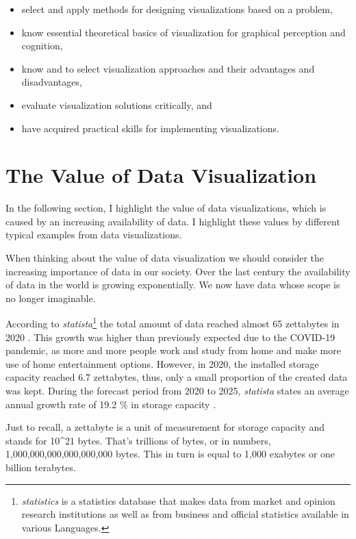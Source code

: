 \documentclass[
]{book}
\providecommand{\tightlist}{%
  \setlength{\itemsep}{0pt}\setlength{\parskip}{0pt}}
\begin{document}
\begin{itemize}
\tightlist
\item
  select and apply methods for designing visualizations based on a problem,
\item
  know essential theoretical basics of visualization for graphical perception and cognition,
\item
  know and to select visualization approaches and their advantages and disadvantages,
\item
  evaluate visualization solutions critically, and
\item
  have acquired practical skills for implementing visualizations.
\end{itemize}

\hypertarget{the-value-of-data-visualization}{%
\chapter{The Value of Data Visualization}\label{the-value-of-data-visualization}}

In the following section, I highlight the value of data visualizations, which is caused by an increasing availability of data. I highlight these values by different typical examples from data visualizations.

When thinking about the value of data visualization we should consider the increasing importance of data in our society. Over the last century the availability of data in the world is growing exponentially. We now have data whose scope is no longer imaginable.

According to \emph{statista}\footnote{\emph{statistics} is a statistics database that makes data from market and opinion research institutions as well as from business and official statistics available in various Languages.} the total amount of data reached almost 65 zettabytes in 2020 \citep{statista2021}. This growth was higher than previously expected due to the COVID-19 pandemic, as more and more people work and study from home and make more use of home entertainment options. However, in 2020, the installed storage capacity reached 6.7 zettabytes, thus, only a small proportion of the created data was kept. During the forecast period from 2020 to 2025, \emph{statista} states an average annual growth rate of 19.2 \% in storage capacity \citep{statista2021}.

Just to recall, a zettabyte is a unit of measurement for storage capacity and stands for 10\^{}21 bytes. That's trillions of bytes, or in numbers, 1,000,000,000,000,000,000 bytes. This in turn is equal to 1,000 exabytes or one billion terabytes.
\end{document}
